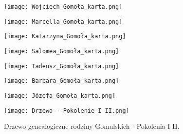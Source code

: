 \begin{figure}[!ht]
    \vspace*{0.5cm}
    \centering \texttt{[image: 
        Wojciech\_Gomoła\_karta.png]}
\end{figure}

\begin{figure}[!ht]
    \vspace*{0.5cm}
    \centering \texttt{[image: 
        Marcella\_Gomoła\_karta.png]}
\end{figure}

\begin{figure}[!ht]
    \vspace*{0.5cm}
    \centering \texttt{[image: 
        Katarzyna\_Gomoła\_karta.png]}
\end{figure}

\begin{figure}[!ht]
    \vspace*{0.5cm}
    \centering \texttt{[image: 
        Salomea\_Gomoła\_karta.png]}
\end{figure}

\begin{figure}[!ht]
    \vspace*{0.5cm}
    \centering \texttt{[image: 
        Tadeusz\_Gomoła\_karta.png]}
\end{figure}

\begin{figure}[!ht]
    \vspace*{0.5cm}
    \centering \texttt{[image: 
        Barbara\_Gomoła\_karta.png]}
\end{figure}

\begin{figure}[!ht]
    \vspace*{0.5cm}
    \centering \texttt{[image: 
        Józefa\_Gomoła\_karta.png]}
\end{figure}

\begin{sidewaysfigure}
    \centering \texttt{[image: 
        Drzewo - Pokolenie I-II.png]}
    \captionsetup{format=hang}
    \caption{Drzewo genealogiczne rodziny Gomulskich - Pokolenia I-II.}
\end{sidewaysfigure}